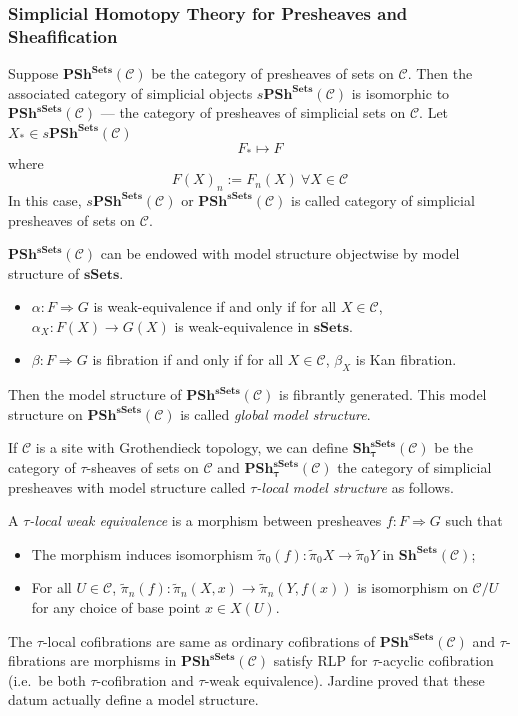 \documentclass[b5paper,10pt]{article}
\begin{document}
\subsubsection{Simplicial Homotopy Theory for Presheaves and Sheafification}
Suppose $\mathbf{PSh}^{\mathbf{Sets}}(\mathcal{C})$ be the category of presheaves of sets on $\mathcal{C}$. Then the associated category of simplicial objects $s\mathbf{PSh^{Sets}}(\mathcal{C})$ is isomorphic to $\mathbf{PSh^{sSets}}(\mathcal{C})$ --- the category of presheaves of simplicial sets on $\mathcal{C}$. Let $X_* \in s\mathbf{PSh^{Sets}}(\mathcal{C})$
\[
F_* \mapsto F
\]
where \[
F(X)_n := F_n(X) \ \forall X \in \mathcal{C}
\]
In this case, $s\mathbf{PSh^{Sets}}(\mathcal{C})$ or $\mathbf{PSh^{sSets}}(\mathcal{C})$ is called category of simplicial presheaves of sets on $\mathcal{C}$.

$\mathbf{PSh^{sSets}}(\mathcal{C})$ can be endowed with model structure objectwise by model structure of $\mathbf{sSets}$.
\begin{itemize}
	\item $\alpha \colon F \Rightarrow G$ is weak-equivalence if and only if for all $X \in \mathcal{C}$, $\alpha_X: F(X) \to G(X)$ is weak-equivalence in $\mathbf{sSets}$.
	\item $\beta\colon F \Rightarrow G$ is fibration if and only if for all $X \in \mathcal{C}$, $\beta_X$ is Kan fibration.
\end{itemize}
Then the model structure of $\mathbf{PSh^{sSets}}(\mathcal{C})$ is fibrantly generated. This model structure on $\mathbf{PSh^{sSets}}(\mathcal{C})$ is called \emph{global model structure}.

If $\mathcal{C}$ is a site with Grothendieck topology, we can define $\mathbf{Sh^{sSets}_\tau} (\mathcal{C})$ be the category of $\tau$-sheaves of sets on $\mathcal{C}$ and $\mathbf{PSh_\tau^{sSets}}(\mathcal{C})$ the category of simplicial presheaves with model structure called \emph{$\tau$-local model structure} as follows. 
\begin{secdefn}
	A \emph{$\tau$-local weak equivalence} is a morphism between presheaves $f \colon F \Rightarrow G$ such that
	\begin{itemize}
		\item The morphism induces isomorphism $\tilde{\pi}_0(f): \tilde{\pi}_0X \to \tilde{\pi}_0Y$ in $\mathbf{Sh^{Sets}}(\mathcal{C})$;
		\item For all $U \in \mathcal{C}$, $\tilde{\pi}_n(f): \tilde{\pi}_n(X,x) \to \tilde{\pi}_n(Y,f(x))$ is isomorphism on $\mathcal{C}/U$ for any choice of base point $x \in X(U)$.
	\end{itemize}
\end{secdefn}
The $\tau$-local cofibrations are same as ordinary cofibrations of $\mathbf{PSh^{sSets}}(\mathcal{C})$ and $\tau$-fibrations are morphisms in $\mathbf{PSh^{sSets}}(\mathcal{C})$ satisfy RLP for $\tau$-acyclic cofibration (i.e.\ be both $\tau$-cofibration and $\tau$-weak equivalence). Jardine proved that these datum actually define a model structure.
\end{document}
